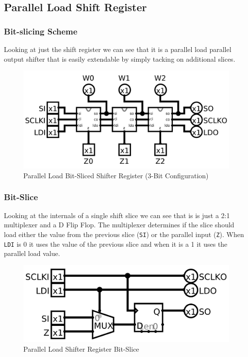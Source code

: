 \documentclass{article}
\begin{document}
    \newpage
    \subsection{Parallel Load Shift Register}

        \subsubsection{Bit-slicing Scheme}
        Looking at just the shift register we can see that it is a parallel
        load parallel output shifter that is easily extendable by simply
        tacking on additional slices.
        \begin{figure}[H]
            \centering
            \includegraphics[width=\linewidth]{../../logisim/shift.png}
            \caption{Parallel Load Bit-Sliced Shifter Register (3-Bit Configuration)}
        \end{figure}

        \subsubsection{Bit-Slice}
        Looking at the internals of a single shift slice we can see that is is
        just a 2:1 multiplexer and a D Flip Flop. The multiplexer determines if
        the slice should load either the value from the previous slice
        (\texttt{SI}) or the parallel input (\texttt{Z}). When \texttt{LDI} is
        0 it uses the value of the previous slice and when it is a 1 it uses
        the parallel load value.
        \begin{figure}[H]
            \centering
            \includegraphics[width=\linewidth]{../../logisim/shift_slice.png}
            \caption{Parallel Load Shifter Register Bit-Slice}
        \end{figure}
\end{document}
